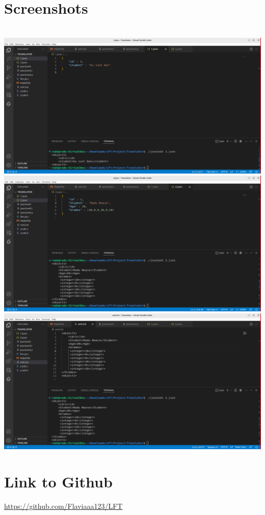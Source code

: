 \documentclass{article}
\begin{document}
\section{Screenshots}\\
\includegraphics[width=\linewidth]{ss1.png}\\
\includegraphics[width=\linewidth]{ss2.png}\\
\includegraphics[width=\linewidth]{ss3.png}\\
\section{Link to Github}
\url{https://github.com/Flaviaaa123/LFT} \\
\end{document}
